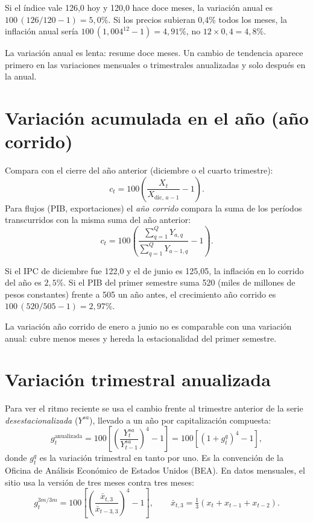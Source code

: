 \begin{dato}
Si el índice vale 126,0 hoy y 120,0 hace doce meses, la variación anual es $100\,(126/120-1)=5{,}0\%$. Si los
precios subieran 0,4\% todos los meses, la inflación anual sería $100\,(1{,}004^{12}-1)=4{,}91\%$, no $12\times0{,}4=4{,}8\%$.
\end{dato}

\begin{leer}
La variación anual es lenta: resume doce meses. Un cambio de tendencia aparece primero en las variaciones
mensuales o trimestrales anualizadas y solo después en la anual.
\end{leer}

\section{Variación acumulada en el año (año corrido)}
Compara con el cierre del año anterior (diciembre o el cuarto trimestre):
\[
c_t = 100\left(\frac{X_t}{X_{\text{dic},\,a-1}}-1\right).
\]
Para flujos (PIB, exportaciones) el \emph{año corrido} compara la suma de los períodos transcurridos con la
misma suma del año anterior:
\[
c_t = 100\left(\frac{\sum_{q=1}^{Q}Y_{a,q}}{\sum_{q=1}^{Q}Y_{a-1,q}}-1\right).
\]

\begin{dato}
Si el IPC de diciembre fue 122,0 y el de junio es 125,05, la inflación en lo corrido del año es $2{,}5\%$. Si el PIB
del primer semestre suma 520 (miles de millones de pesos constantes) frente a 505 un año antes, el crecimiento
año corrido es $100\,(520/505-1)=2{,}97\%$.
\end{dato}

\begin{alerta}
La variación año corrido de enero a junio no es comparable con una variación anual: cubre menos meses y hereda la
estacionalidad del primer semestre.
\end{alerta}

\section{Variación trimestral anualizada}
\label{es:f:anualizada}
Para ver el ritmo reciente se usa el cambio frente al trimestre anterior de la serie
\emph{desestacionalizada} ($Y^{sa}$), llevado a un año por capitalización compuesta:
\[
g^{\text{anualizada}}_t = 100\left[\left(\frac{Y^{sa}_t}{Y^{sa}_{t-1}}\right)^{4}-1\right]
=100\left[(1+g^{q}_t)^4-1\right],
\]
donde $g^q_t$ es la variación trimestral en tanto por uno. Es la convención de la Oficina de Análisis Económico
de Estados Unidos (BEA). En datos mensuales, el sitio usa la versión de tres meses contra tres meses:
\[
g^{3m/3m}_t = 100\left[\left(\frac{\bar x_{t,3}}{\bar x_{t-3,3}}\right)^{4}-1\right],\qquad
\bar x_{t,3}=\tfrac13(x_t+x_{t-1}+x_{t-2}).
\]

